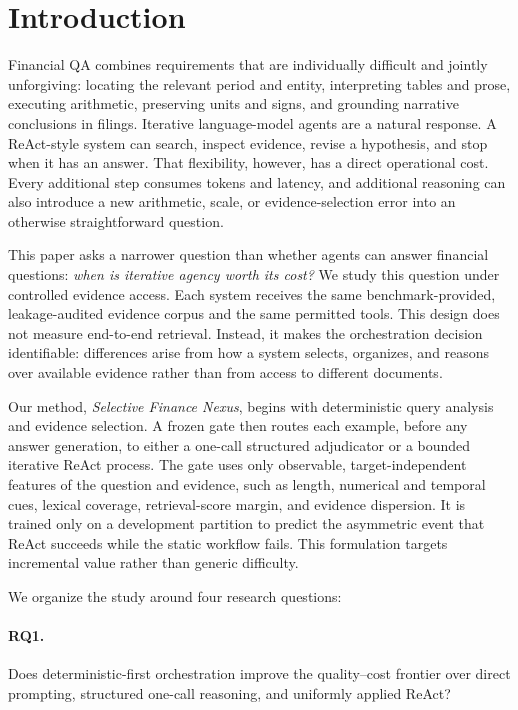\section{Introduction}

Financial QA combines requirements that are individually difficult and jointly unforgiving: locating the relevant period and entity, interpreting tables and prose, executing arithmetic, preserving units and signs, and grounding narrative conclusions in filings. Iterative language-model agents are a natural response. A ReAct-style system can search, inspect evidence, revise a hypothesis, and stop when it has an answer. That flexibility, however, has a direct operational cost. Every additional step consumes tokens and latency, and additional reasoning can also introduce a new arithmetic, scale, or evidence-selection error into an otherwise straightforward question.

This paper asks a narrower question than whether agents can answer financial questions: \emph{when is iterative agency worth its cost?} We study this question under controlled evidence access. Each system receives the same benchmark-provided, leakage-audited evidence corpus and the same permitted tools. This design does not measure end-to-end retrieval. Instead, it makes the orchestration decision identifiable: differences arise from how a system selects, organizes, and reasons over available evidence rather than from access to different documents.

Our method, \emph{Selective Finance Nexus}, begins with deterministic query analysis and evidence selection. A frozen gate then routes each example, before any answer generation, to either a one-call structured adjudicator or a bounded iterative ReAct process. The gate uses only observable, target-independent features of the question and evidence, such as length, numerical and temporal cues, lexical coverage, retrieval-score margin, and evidence dispersion. It is trained only on a development partition to predict the asymmetric event that ReAct succeeds while the static workflow fails. This formulation targets incremental value rather than generic difficulty.

We organize the study around four research questions:

\paragraph{RQ1.} Does deterministic-first orchestration improve the quality--cost frontier over direct prompting, structured one-call reasoning, and uniformly applied ReAct?
